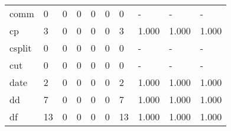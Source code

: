 \begin{longtable}{lp{1.3cm}p{1.3cm}p{1.3cm}p{1.3cm}p{1.3cm}p{1.3cm}p{1.3cm}p{1.3cm}p{1.3cm}}
comm      &                      0 &                                             0 &                                            0 &                                           0 &                                            0 &                                          0 &                                    - &                                      - &                                    - \\
cp        &                      3 &                                             0 &                                            0 &                                           0 &                                            0 &                                          3 &                                1.000 &                                  1.000 &                                1.000 \\
csplit    &                      0 &                                             0 &                                            0 &                                           0 &                                            0 &                                          0 &                                    - &                                      - &                                    - \\
cut       &                      0 &                                             0 &                                            0 &                                           0 &                                            0 &                                          0 &                                    - &                                      - &                                    - \\
date      &                      2 &                                             0 &                                            0 &                                           0 &                                            0 &                                          2 &                                1.000 &                                  1.000 &                                1.000 \\
dd        &                      7 &                                             0 &                                            0 &                                           0 &                                            0 &                                          7 &                                1.000 &                                  1.000 &                                1.000 \\
df        &                     13 &                                             0 &                                            0 &                                           0 &                                            0 &                                         13 &                                1.000 &                                  1.000 &                                1.000 \\

\end{longtable}
